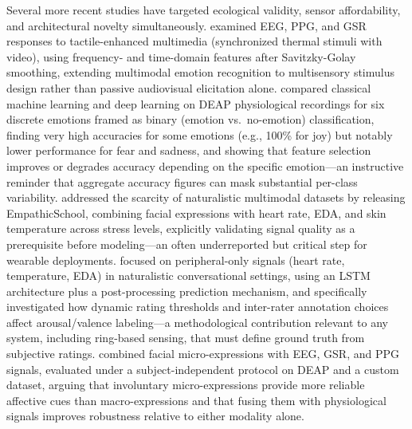 Several more recent studies have targeted ecological validity, sensor affordability, and architectural novelty simultaneously. \cite{raheel2020physiological} examined EEG, PPG, and GSR responses to tactile-enhanced multimedia (synchronized thermal stimuli with video), using frequency- and time-domain features after Savitzky-Golay smoothing, extending multimodal emotion recognition to multisensory stimulus design rather than passive audiovisual elicitation alone. \cite{balan2019emotion} compared classical machine learning and deep learning on DEAP physiological recordings for six discrete emotions framed as binary (emotion vs.\ no-emotion) classification, finding very high accuracies for some emotions (e.g., 100\% for joy) but notably lower performance for fear and sadness, and showing that feature selection improves or degrades accuracy depending on the specific emotion---an instructive reminder that aggregate accuracy figures can mask substantial per-class variability. \cite{hosseini2022multimodal} addressed the scarcity of naturalistic multimodal datasets by releasing EmpathicSchool, combining facial expressions with heart rate, EDA, and skin temperature across stress levels, explicitly validating signal quality as a prerequisite before modeling---an often underreported but critical step for wearable deployments. \cite{zitouni2022lstm} focused on peripheral-only signals (heart rate, temperature, EDA) in naturalistic conversational settings, using an LSTM architecture plus a post-processing prediction mechanism, and specifically investigated how dynamic rating thresholds and inter-rater annotation choices affect arousal/valence labeling---a methodological contribution relevant to any system, including ring-based sensing, that must define ground truth from subjective ratings. \cite{saffaryazdi2022facial} combined facial micro-expressions with EEG, GSR, and PPG signals, evaluated under a subject-independent protocol on DEAP and a custom dataset, arguing that involuntary micro-expressions provide more reliable affective cues than macro-expressions and that fusing them with physiological signals improves robustness relative to either modality alone.


